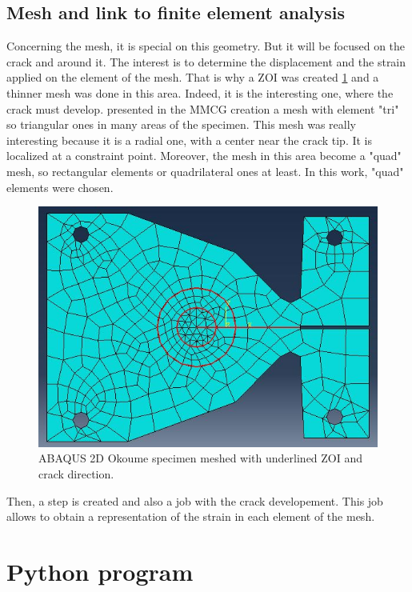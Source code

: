 \subsection{Mesh and link to finite element analysis}
Concerning the mesh, it is special on this geometry. But it will be focused on the crack and around it. The interest is to determine the displacement and the strain applied on the element of the mesh. That is why a ZOI was created \ref{fig:Fig16} and a thinner mesh was done in this area. Indeed, it is the interesting one, where the crack must develop. \parencite{Reference8} presented in the MMCG creation a mesh with element "tri" so triangular ones in many areas of the specimen. This mesh was really interesting because it is a radial one, with a center near the crack tip. It is localized at a constraint point. Moreover, the mesh in this area become a "quad" mesh, so rectangular elements or quadrilateral ones at least. In this work, "quad" elements were chosen.
\begin{figure}[h]
	\centering
	\includegraphics[scale=0.5]{Figures/Abaqus_Screenshot}
	\decoRule
	\caption[ABAQUS 2D specimen]{ABAQUS 2D Okoume specimen meshed with underlined ZOI and crack direction.}
	\label{fig:Fig16}
\end{figure}
Then, a step is created and also a job with the crack developement. This job allows to obtain a representation of the strain in each element of the mesh.

\section{Python program}

